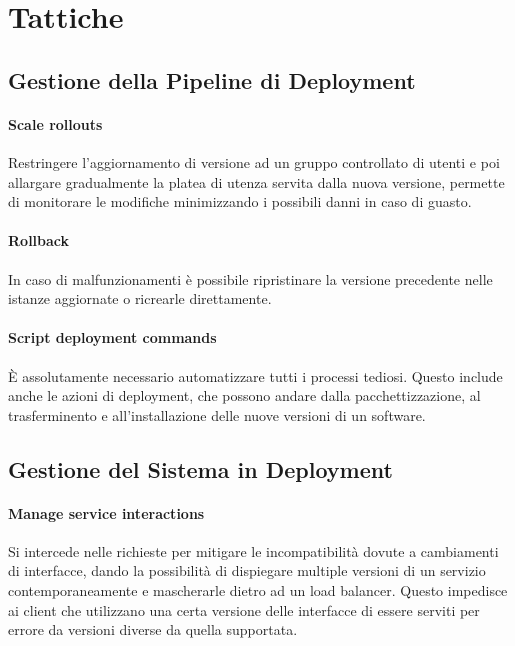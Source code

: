 \documentclass[a4paper,11pt,oneside, table]{article}
\begin{document}
  \section{Tattiche}

  \subsection{Gestione della Pipeline di Deployment}

  \paragraph{Scale rollouts}

  Restringere l'aggiornamento di versione ad un gruppo controllato di utenti e poi allargare gradualmente la platea di utenza servita dalla nuova versione, permette di monitorare le modifiche minimizzando i possibili danni in caso di guasto.

  \paragraph{Rollback}

  In caso di malfunzionamenti \`e possibile ripristinare la versione precedente nelle istanze aggiornate o ricrearle direttamente.

  \paragraph{Script deployment commands}

  \`E assolutamente necessario automatizzare tutti i processi tediosi. Questo include anche le azioni di deployment, che possono andare dalla pacchettizzazione, al trasferminento e all'installazione delle nuove versioni di un software.

  \subsection{Gestione del Sistema in Deployment}

  \paragraph{Manage service interactions}

  Si intercede nelle richieste per mitigare le incompatibilit\`a dovute a cambiamenti di interfacce, dando la possibilit\`a di dispiegare multiple versioni di un servizio contemporaneamente e mascherarle dietro ad un load balancer. Questo impedisce ai client che utilizzano una certa versione delle interfacce di essere serviti per errore da versioni diverse da quella supportata.
\end{document}
